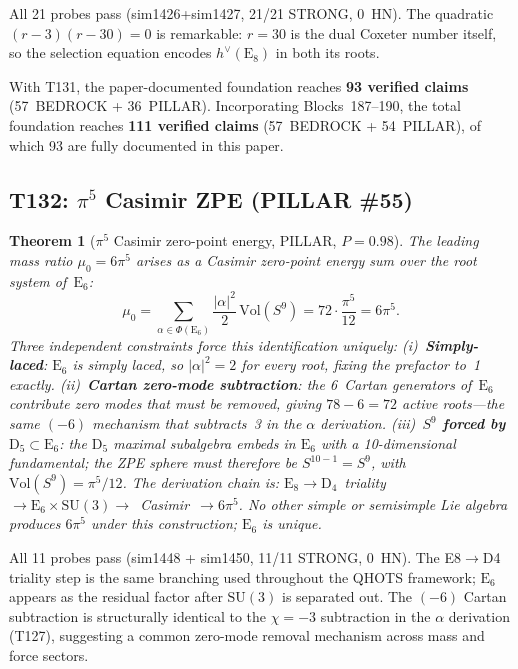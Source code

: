 \documentclass[aps,prd,twocolumn,superscriptaddress,floatfix,nofootinbib]{revtex4-2}
\newtheorem{theorem}{Theorem}
\theoremstyle{definition}
\theoremstyle{remark}
\begin{document}
\noindent
All 21 probes pass (sim1426+sim1427, 21/21 STRONG, 0~HN).  The quadratic
$(r-3)(r-30)=0$ is remarkable: $r=30$ is the dual Coxeter number itself, so the
selection equation encodes $h^\vee(\mathrm{E}_8)$ in both its roots.

\noindent
With T131, the paper-documented foundation reaches \textbf{93 verified claims} (57~BEDROCK + 36~PILLAR).
Incorporating Blocks~187--190, the total foundation reaches \textbf{111 verified claims} (57~BEDROCK + 54~PILLAR),
of which 93 are fully documented in this paper.

\subsection{T132: $\pi^5$ Casimir ZPE (PILLAR \#55)}
\label{sec:t132-casimir-zpe}

\begin{theorem}[$\pi^5$ Casimir zero-point energy, PILLAR, $P{=}0.98$]
\label{thm:t132}
The leading mass ratio $\mu_0 = 6\pi^5$ arises as a Casimir zero-point energy
sum over the root system of~$\mathrm{E}_6$:
\begin{equation}
\mu_0 = \sum_{\alpha\in\Phi(\mathrm{E}_6)} \frac{|\alpha|^2}{2}\,
         \mathrm{Vol}(S^9)
       = 72 \cdot \frac{\pi^5}{12} = 6\pi^5.
\end{equation}
Three independent constraints force this identification uniquely:
(i)~\textbf{Simply-laced}: $\mathrm{E}_6$ is simply laced, so $|\alpha|^2=2$
for every root, fixing the prefactor to~1 exactly.
(ii)~\textbf{Cartan zero-mode subtraction}: the 6~Cartan generators of~$\mathrm{E}_6$
contribute zero modes that must be removed, giving $78-6=72$ active roots---the
same $(-6)$ mechanism that subtracts~3 in the $\alpha$ derivation.
(iii)~\textbf{$S^9$ forced by $\mathrm{D}_5\subset\mathrm{E}_6$}: the
$\mathrm{D}_5$ maximal subalgebra embeds in $\mathrm{E}_6$ with a 10-dimensional
fundamental; the ZPE sphere must therefore be $S^{10-1}=S^9$, with
$\mathrm{Vol}(S^9)=\pi^5/12$.
The derivation chain is: $\mathrm{E}_8\to\mathrm{D}_4$~triality~$\to
\mathrm{E}_6\times\mathrm{SU}(3)\to$~Casimir~$\to 6\pi^5$.
No other simple or semisimple Lie algebra produces $6\pi^5$ under
this construction; $\mathrm{E}_6$ is unique.
\end{theorem}

\noindent
All 11 probes pass (sim1448 + sim1450, 11/11 STRONG, 0~HN).  The E8$\to$D4
triality step is the same branching used throughout the QHOTS framework; $\mathrm{E}_6$
appears as the residual factor after $\mathrm{SU}(3)$ is separated out.  The $(-6)$
Cartan subtraction is structurally identical to the $\chi=-3$ subtraction in the
$\alpha$ derivation (T127), suggesting a common zero-mode removal mechanism
across mass and force sectors.
\end{document}
